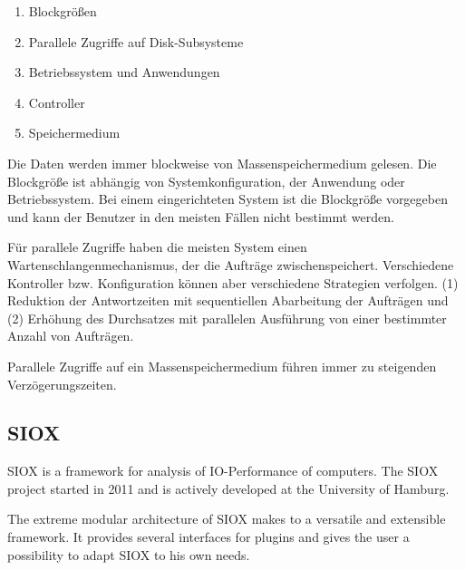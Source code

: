 \begin{enumerate}
	\item Blockgrößen
	\item Parallele Zugriffe auf Disk-Subsysteme
	\item Betriebssystem und Anwendungen
	\item Controller
	\item Speichermedium
\end{enumerate}

Die Daten werden immer blockweise von Massenspeichermedium gelesen. Die Blockgröße ist abhängig von Systemkonfiguration, der Anwendung oder Betriebssystem. Bei einem eingerichteten System ist die Blockgröße vorgegeben und kann der Benutzer in den meisten Fällen nicht bestimmt werden. 

Für parallele Zugriffe haben die meisten System einen Wartenschlangenmechanismus, der die Aufträge zwischenspeichert. Verschiedene Kontroller bzw. Konfiguration können aber verschiedene Strategien verfolgen. (1) Reduktion der Antwortzeiten mit sequentiellen Abarbeitung der Aufträgen und (2) Erhöhung des Durchsatzes mit parallelen Ausführung von einer bestimmter Anzahl von Aufträgen.

Parallele Zugriffe auf ein Massenspeichermedium führen immer zu steigenden Verzögerungszeiten.



\subsection{SIOX}

SIOX is a framework for analysis of IO-Performance of computers. The SIOX project started in 2011 and is actively developed at the University of Hamburg. 

The extreme modular architecture of SIOX makes to a versatile and extensible framework. It provides several interfaces for plugins and gives the user a possibility to adapt SIOX to his own needs.
